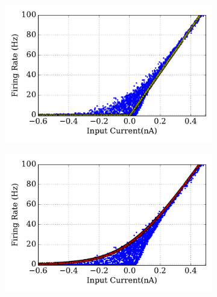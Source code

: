 	\DIFaddend \begin{figure}[tbh!]
		\centering
		\begin{subfigure}[t]{0.48\textwidth}
			\DIFdelbeginFL %
\DIFdelendFL \DIFaddbeginFL \includegraphics[width=\textwidth]{pics_iconip/revise_6-5-1.pdf}
			\caption{}
		\DIFaddendFL \end{subfigure}
		\begin{subfigure}[t]{0.48\textwidth}
			\DIFdelbeginFL %
\DIFdelendFL \DIFaddbeginFL \includegraphics[width=\textwidth]{pics_iconip/revise_6-5-2.pdf}
			\caption{}
		\DIFaddendFL \end{subfigure}\\
		\begin{subfigure}[t]{0.6\textwidth}

\end{subfigure}
\end{figure}
